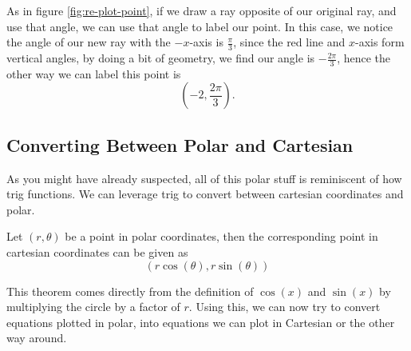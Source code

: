 \begin{ex}
\begin{figure*}[h]
{}
	\caption{}
	\label{fig:re-plot-point}
	\end{figure*}
	As in figure \eqref{fig:re-plot-point}, if we draw a ray opposite of our original ray, and use that angle, we can use that angle to label our point. In this case, we notice the angle of our new ray with the $-x$-axis is $\frac{\pi}{3}$, since the red line and $x$-axis form vertical angles, by doing a bit of geometry, we find our angle is $-\frac{2\pi}{3}$, hence the other way we can label this point is
	$$(-2,\frac{2\pi}{3}).$$
\end{ex}

\subsection{Converting Between Polar and Cartesian}
As you might have already suspected, all of this polar stuff is reminiscent of how trig functions. We can leverage trig to convert between cartesian coordinates and polar.

\begin{theorem}
Let $(r,\theta)$ be a point in polar coordinates, then the corresponding point in cartesian coordinates can be given as
$$(r\cos(\theta),r\sin(\theta))$$
\label{thm:poletocart}
\end{theorem}
This theorem comes directly from the definition of $\cos(x)$ and $\sin(x)$ by multiplying the circle by a factor of $r$. Using this, we can now try to convert equations plotted in polar, into equations we can plot in Cartesian or the other way around.

